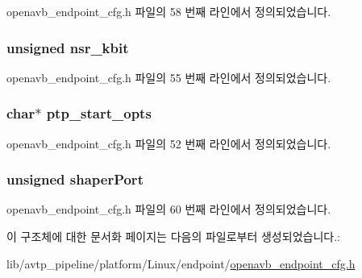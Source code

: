 openavb\+\_\+endpoint\+\_\+cfg.\+h 파일의 58 번째 라인에서 정의되었습니다.

\subsubsection[{\texorpdfstring{nsr\+\_\+kbit}{nsr_kbit}}]{\setlength{\rightskip}{0pt plus 5cm}unsigned nsr\+\_\+kbit}\hypertarget{structopenavb__endpoint__cfg__t_a786d3fe3842764d5a022f0227542c759}{}\label{structopenavb__endpoint__cfg__t_a786d3fe3842764d5a022f0227542c759}


openavb\+\_\+endpoint\+\_\+cfg.\+h 파일의 55 번째 라인에서 정의되었습니다.

\subsubsection[{\texorpdfstring{ptp\+\_\+start\+\_\+opts}{ptp_start_opts}}]{\setlength{\rightskip}{0pt plus 5cm}char$\ast$ ptp\+\_\+start\+\_\+opts}\hypertarget{structopenavb__endpoint__cfg__t_aeb1ec327c597df953ede6b8d381cc672}{}\label{structopenavb__endpoint__cfg__t_aeb1ec327c597df953ede6b8d381cc672}


openavb\+\_\+endpoint\+\_\+cfg.\+h 파일의 52 번째 라인에서 정의되었습니다.

\subsubsection[{\texorpdfstring{shaper\+Port}{shaperPort}}]{\setlength{\rightskip}{0pt plus 5cm}unsigned shaper\+Port}\hypertarget{structopenavb__endpoint__cfg__t_af0b95a8fd7e3488230cbdd50df54d6ab}{}\label{structopenavb__endpoint__cfg__t_af0b95a8fd7e3488230cbdd50df54d6ab}


openavb\+\_\+endpoint\+\_\+cfg.\+h 파일의 60 번째 라인에서 정의되었습니다.



이 구조체에 대한 문서화 페이지는 다음의 파일로부터 생성되었습니다.\+:\begin{DoxyCompactItemize}
\item 
lib/avtp\+\_\+pipeline/platform/\+Linux/endpoint/\hyperlink{openavb__endpoint__cfg_8h}{openavb\+\_\+endpoint\+\_\+cfg.\+h}\end{DoxyCompactItemize}
